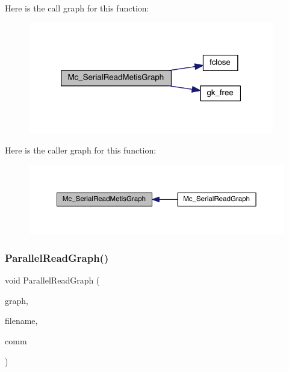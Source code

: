 Here is the call graph for this function\+:\nopagebreak
\begin{figure}[H]
\begin{center}
\leavevmode
\includegraphics[width=304pt]{a00861_ab618501d6d645eabdbe89cc62d33a54f_cgraph}
\end{center}
\end{figure}
Here is the caller graph for this function\+:\nopagebreak
\begin{figure}[H]
\begin{center}
\leavevmode
\includegraphics[width=350pt]{a00861_ab618501d6d645eabdbe89cc62d33a54f_icgraph}
\end{center}
\end{figure}
\mbox{\label{a00861_abcd3804c62bf4464f2c8de37a42e6ef8}} 
\subsubsection{\texorpdfstring{Parallel\+Read\+Graph()}{ParallelReadGraph()}}
{\footnotesize\ttfamily void Parallel\+Read\+Graph (\begin{DoxyParamCaption}\item[{\hyperlink{a00734}{graph\+\_\+t} $\ast$}]{graph,  }\item[{char $\ast$}]{filename,  }\item[{M\+P\+I\+\_\+\+Comm}]{comm }\end{DoxyParamCaption})}

